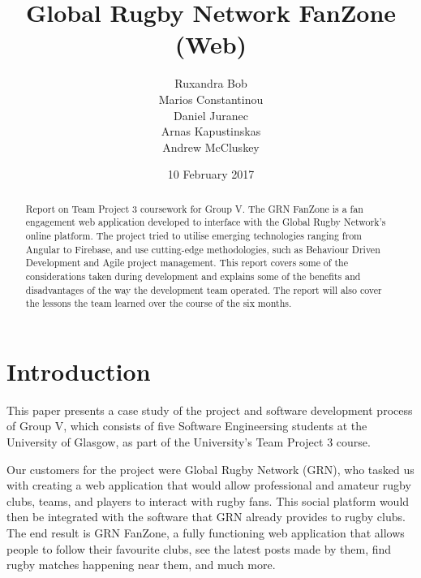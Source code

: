 \documentclass{l3proj}
\begin{document}
\title{Global Rugby Network FanZone (Web)}
\author{Ruxandra Bob \\
		Marios Constantinou \\
        Daniel Juranec \\
        Arnas Kapustinskas \\
        Andrew McCluskey}
\date{10 February 2017}
\maketitle
\begin{abstract}
Report on Team Project 3 coursework for Group V. The GRN FanZone is a
 fan engagement web application developed to interface with the Global Rugby
 Network's online platform. The project tried to utilise
 emerging technologies ranging from Angular to Firebase, and use
 cutting-edge methodologies, such as Behaviour Driven Development and Agile
 project management. This report covers some of the considerations taken
 during development and explains some of the benefits and disadvantages
 of the way the development team operated. The report will also cover the lessons
 the team learned over the course of the six months.
\end{abstract}
\educationalconsent
\newpage
\section{Introduction} %

This paper presents a case study of the project and software development process
 of Group V, which consists of five Software Engineersing students at the
 University of Glasgow, as part of the University's Team Project 3 course.

Our customers for the project were Global Rugby Network (GRN), who tasked us
 with creating a web application that would allow professional and amateur
 rugby clubs, teams, and players to interact with rugby fans. This social
 platform would then be integrated with the software that GRN already provides
 to rugby clubs. The end result is GRN FanZone, a fully functioning web application
 that allows people to follow their favourite clubs, see the latest posts
 made by them, find rugby matches happening near them, and much more.
\end{document}
